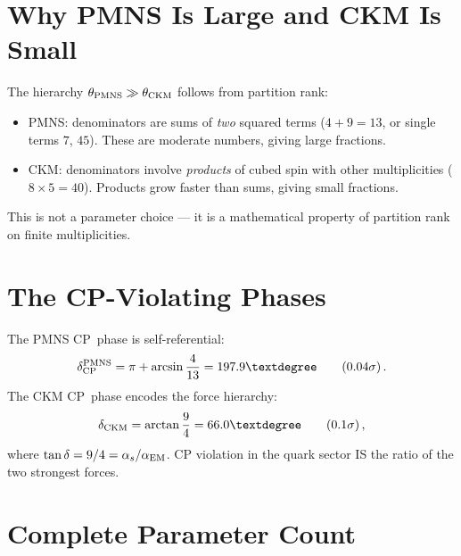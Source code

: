 \documentclass[11pt,letterpaper]{article}
\numberwithin{equation}{section}
\begin{document}
\section{Why PMNS Is Large and CKM Is Small}

The hierarchy $\theta_{\rm PMNS} \gg \theta_{\rm CKM}$ follows from
partition rank:
\begin{itemize}
\item PMNS: denominators are sums of \emph{two} squared terms
  ($4+9 = 13$, or single terms $7$, $45$).  These are moderate
  numbers, giving large fractions.
\item CKM: denominators involve \emph{products} of cubed spin with
  other multiplicities ($8 \times 5 = 40$).  Products grow faster than
  sums, giving small fractions.
\end{itemize}
This is not a parameter choice --- it is a mathematical property of
partition rank on finite multiplicities.

\section{The CP-Violating Phases}

The PMNS CP~phase is self-referential:
\begin{equation}
  \delta_{\rm CP}^{\rm PMNS} = \pi + \arcsin\frac{4}{13} = 197.9°
  \qquad(0.04\sigma)\,.
\end{equation}
The CKM CP~phase encodes the force hierarchy:
\begin{equation}
  \delta_{\rm CKM} = \arctan\frac{9}{4} = 66.0°
  \qquad(0.1\sigma)\,,
\end{equation}
where $\tan\delta = 9/4 = \alpha_s/\alpha_{\rm EM}$.  CP violation
in the quark sector IS the ratio of the two strongest forces.

\section{Complete Parameter Count}
\end{document}
